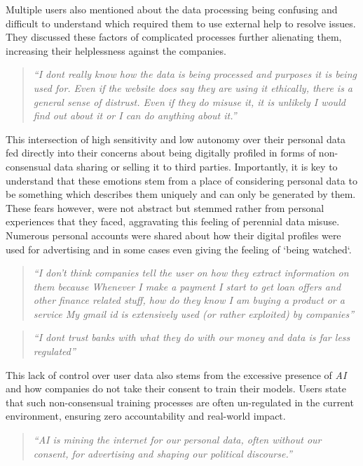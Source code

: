 Multiple users also mentioned about the data processing being confusing and difficult to understand which required them to use external help to resolve issues. They discussed these factors of complicated processes further alienating them, increasing their helplessness against the companies. 

\begin{quote}
    \textit{``I dont really know how the data is being processed and purposes it is being used for. Even if the website does say they are using it ethically, there is a general sense of distrust. Even if they do misuse it, it is unlikely I would find out about it or I can do anything about it.''}
\end{quote}

This intersection of high sensitivity and low autonomy over their personal data fed directly into their concerns about being digitally profiled in forms of non-consensual data sharing or selling it to third parties. Importantly, it is key to understand that these emotions stem from a place of considering personal data to be something which describes them uniquely and can only be generated by them. These fears however, were not abstract but stemmed rather from personal experiences that they faced, aggravating this feeling of perennial data misuse. Numerous personal accounts were shared about how their digital profiles were used for advertising and in some cases even giving the feeling of `being watched`.

\begin{quote}
    \textit{``I don't think companies tell the user on how they extract information on them because Whenever I make a payment I start to get loan offers and other finance related stuff, how do they know I am buying a product or a service My gmail id is extensively used (or rather exploited) by companies''}
\end{quote}
\begin{quote}
    \textit{``I dont trust banks with what they do with our money and data is far less regulated''}
\end{quote}

This lack of control over user data also stems from the excessive presence of \textit{AI} and how companies do not take their consent to train their models. Users state that such non-consensual training processes are often un-regulated in the current environment, ensuring zero accountability and real-world impact.

\begin{quote}
    \textit{``AI is mining the internet for our personal data, often without our consent, for advertising and shaping our political discourse.''}
\end{quote}

